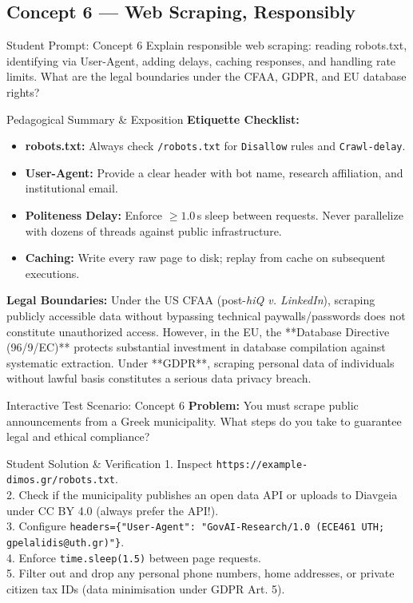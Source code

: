 \documentclass[11pt,a4paper]{article}
\begin{document}
\subsection{Concept 6 --- Web Scraping, Responsibly}
\begin{promptbox}{Student Prompt: Concept 6}
Explain responsible web scraping: reading robots.txt, identifying via User-Agent, adding delays, caching responses, and handling rate limits. What are the legal boundaries under the CFAA, GDPR, and EU database rights?
\end{promptbox}

\begin{evalbox}{Pedagogical Summary \& Exposition}
\textbf{Etiquette Checklist:}
\begin{itemize}
    \item \textbf{robots.txt:} Always check \texttt{/robots.txt} for \texttt{Disallow} rules and \texttt{Crawl-delay}.
    \item \textbf{User-Agent:} Provide a clear header with bot name, research affiliation, and institutional email.
    \item \textbf{Politeness Delay:} Enforce $\ge 1.0$\,s sleep between requests. Never parallelize with dozens of threads against public infrastructure.
    \item \textbf{Caching:} Write every raw page to disk; replay from cache on subsequent executions.
\end{itemize}
\textbf{Legal Boundaries:} Under the US CFAA (post-\emph{hiQ v. LinkedIn}), scraping publicly accessible data without bypassing technical paywalls/passwords does not constitute unauthorized access. However, in the EU, the **Database Directive (96/9/EC)** protects substantial investment in database compilation against systematic extraction. Under **GDPR**, scraping personal data of individuals without lawful basis constitutes a serious data privacy breach.
\end{evalbox}

\begin{testbox}{Interactive Test Scenario: Concept 6}
\textbf{Problem:} You must scrape public announcements from a Greek municipality. What steps do you take to guarantee legal and ethical compliance?
\end{testbox}

\begin{evalbox}{Student Solution \& Verification}
1. Inspect \texttt{https://example-dimos.gr/robots.txt}.\\
2. Check if the municipality publishes an open data API or uploads to Diavgeia under CC BY 4.0 (always prefer the API!).\\
3. Configure \texttt{headers=\{"User-Agent": "GovAI-Research/1.0 (ECE461 UTH; gpelalidis@uth.gr)"\}}.\\
4. Enforce \texttt{time.sleep(1.5)} between page requests.\\
5. Filter out and drop any personal phone numbers, home addresses, or private citizen tax IDs (data minimisation under GDPR Art. 5).
\end{evalbox}
\end{document}
